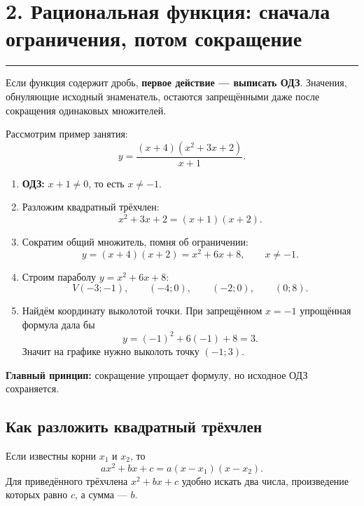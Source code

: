 \documentclass[a4paper,12pt]{article}
\newcommand{\sectionrule}{\vspace{-0.4em}\noindent\color{rulegray}\rule{\linewidth}{0.6pt}\color{textgray}\vspace{0.4em}}
\newcommand{\key}[1]{\textcolor{darkaccent}{\textbf{#1}}}
\begin{document}
\clearpage
\section*{2. Рациональная функция: сначала ограничения, потом сокращение}
\sectionrule

Если функция содержит дробь, \key{первое действие --- выписать ОДЗ}. Значения, обнуляющие исходный знаменатель, остаются запрещёнными даже после сокращения одинаковых множителей.

Рассмотрим пример занятия:
\[
 y=\frac{(x+4)(x^2+3x+2)}{x+1}.
\]

\begin{enumerate}
  \item \key{ОДЗ:} $x+1\ne0$, то есть $x\ne-1$.
  \item Разложим квадратный трёхчлен:
  \[
    x^2+3x+2=(x+1)(x+2).
  \]
  \item Сократим общий множитель, помня об ограничении:
  \[
    y=(x+4)(x+2)=x^2+6x+8,\qquad x\ne-1.
  \]
  \item Строим параболу $y=x^2+6x+8$:
  \[
    V(-3;-1),\qquad (-4;0),\qquad (-2;0),\qquad (0;8).
  \]
  \item Найдём координату выколотой точки. При запрещённом $x=-1$ упрощённая формула дала бы
  \[
    y=(-1)^2+6(-1)+8=3.
  \]
  Значит на графике нужно выколоть точку $(-1;3)$.
\end{enumerate}

\begin{center}
\end{center}

\key{Главный принцип:} сокращение упрощает формулу, но исходное ОДЗ сохраняется.

\subsection*{Как разложить квадратный трёхчлен}
Если известны корни $x_1$ и $x_2$, то
\[
  ax^2+bx+c=a(x-x_1)(x-x_2).
\]
Для приведённого трёхчлена $x^2+bx+c$ удобно искать два числа, произведение которых равно $c$, а сумма --- $b$.
\end{document}
